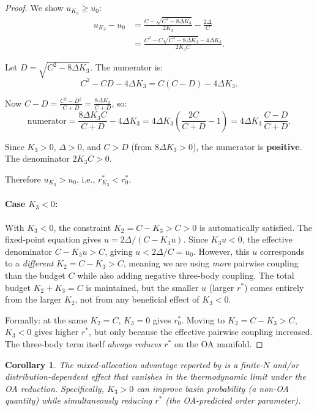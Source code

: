 \documentclass[11pt]{article}
\newtheorem{corollary}{Corollary}
\begin{document}
\begin{proof}
  We show $u_{K_3} \ge u_0$:
  \begin{align}
    u_{K_3} - u_0 &= \frac{C - \sqrt{C^2 - 8\Delta K_3}}{2K_3} - \frac{2\Delta}{C} \\
    &= \frac{C^2 - C\sqrt{C^2 - 8\Delta K_3} - 4\Delta K_3}{2K_3 C}.
  \end{align}

  Let $D = \sqrt{C^2 - 8\Delta K_3}$.  The numerator is:
  \begin{equation}
    C^2 - CD - 4\Delta K_3 = C(C-D) - 4\Delta K_3.
  \end{equation}

  Now $C - D = \frac{C^2 - D^2}{C+D} = \frac{8\Delta K_3}{C+D}$, so:
  \begin{equation}
    \text{numerator} = \frac{8\Delta K_3 C}{C+D} - 4\Delta K_3
    = 4\Delta K_3\left(\frac{2C}{C+D} - 1\right)
    = 4\Delta K_3\,\frac{C-D}{C+D}.
  \end{equation}

  Since $K_3>0$, $\Delta>0$, and $C > D$ (from $8\Delta K_3>0$), the
  numerator is \textbf{positive}.  The denominator $2K_3 C > 0$.

  Therefore $u_{K_3} > u_0$, i.e., $r^*_{K_3} < r^*_0$.

  \paragraph{Case $K_3 < 0$:}
  With $K_3<0$, the constraint $K_2 = C-K_3 > C > 0$ is automatically
  satisfied.  The fixed-point equation gives $u = 2\Delta/(C - K_3 u)$.
  Since $K_3 u < 0$, the effective denominator $C - K_3 u > C$, giving
  $u < 2\Delta/C = u_0$.  However, this $u$ corresponds to a \emph{different}
  $K_2 = C - K_3 > C$, meaning we are using \emph{more} pairwise coupling
  than the budget $C$ while also adding negative three-body coupling.
  The total budget $K_2+K_3 = C$ is maintained, but the smaller $u$ (larger
  $r^*$) comes entirely from the larger $K_2$, not from any beneficial
  effect of $K_3<0$.

  Formally: at the same $K_2 = C$, $K_3=0$ gives $r^*_0$.  Moving to
  $K_2=C-K_3>C$, $K_3<0$ gives higher $r^*$, but only because the
  effective pairwise coupling increased.  The three-body term itself
  \emph{always reduces} $r^*$ on the OA manifold.
\end{proof}

\begin{corollary}
  The mixed-allocation advantage reported by \citet{Muolo2025} is a
  finite-$N$ and/or distribution-dependent effect that vanishes in the
  thermodynamic limit under the OA reduction.  Specifically, $K_3>0$
  can improve \emph{basin probability} (a non-OA quantity) while
  simultaneously reducing $r^*$ (the OA-predicted order parameter).
\end{corollary}
\end{document}
